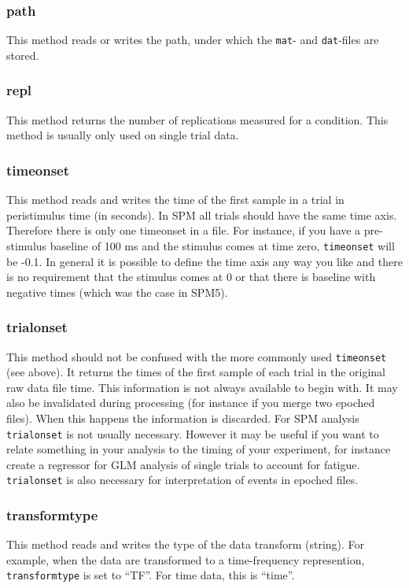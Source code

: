 \subsubsection{path}
This method reads or writes the path, under which the \texttt{mat}- and \texttt{dat}-files are stored.

\subsubsection{repl}
This method returns the number of replications measured for a condition. This method is usually only used on single trial data.

\subsubsection{timeonset}
This method reads and writes the time of the first sample in a trial in peristimulus time (in seconds). In SPM all trials should have the same time axis. Therefore there is only one timeonset in a file. For instance, if you have a pre-stimulus baseline of 100 ms and the stimulus comes at time zero, \texttt{timeonset} will be -0.1. In general it is possible to define the time axis any way you like and there is no requirement that the stimulus comes at 0 or that there is baseline with negative times (which was the case in SPM5).

\subsubsection{trialonset}
This method should not be confused with the more commonly used \texttt{timeonset} (see above). It returns the times of the first sample of each trial in the original raw data file time. This information is not always available to begin with. It may also be invalidated during processing (for instance if you merge two epoched files). When this happens the information is discarded. For SPM analysis \texttt{trialonset} is not usually necessary. However it may be useful if you want to relate something in your analysis to the timing of your experiment, for instance create a regressor for GLM analysis of single trials to account for fatigue. \texttt{trialonset} is also necessary for interpretation of events in epoched files.

\subsubsection{transformtype}
This method reads and writes the type of the data transform (string). For example, when the data are transformed to a time-frequency represention, \texttt{transformtype} is set to ``TF''. For time data, this is ``time''.

